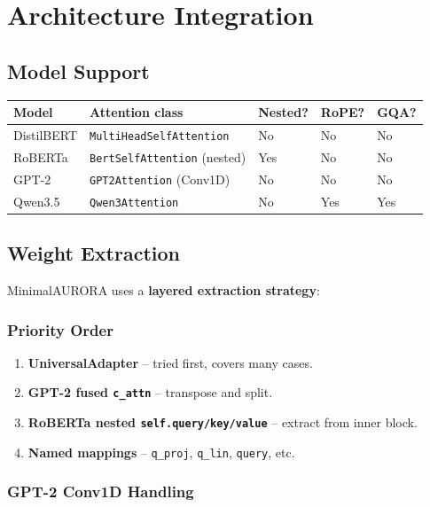 \section{Architecture Integration}

\subsection{Model Support}

\begin{table}[H]
\centering
\small
\begin{tabular}{lllll}
\toprule
\textbf{Model} & \textbf{Attention class} & \textbf{Nested?} & \textbf{RoPE?} & \textbf{GQA?} \\
\midrule
DistilBERT & \texttt{MultiHeadSelfAttention} & No & No & No \\
RoBERTa & \texttt{BertSelfAttention} (nested) & Yes & No & No \\
GPT-2 & \texttt{GPT2Attention} (Conv1D) & No & No & No \\
Qwen3.5 & \texttt{Qwen3Attention} & No & Yes & Yes \\
\bottomrule
\end{tabular}
\end{table}

\subsection{Weight Extraction}

MinimalAURORA uses a \textbf{layered extraction strategy}:

\subsubsection{Priority Order}

\begin{enumerate}
\item \textbf{UniversalAdapter} -- tried first, covers many cases.
\item \textbf{GPT-2 fused \texttt{c\_attn}} -- transpose and split.
\item \textbf{RoBERTa nested \texttt{self.query/key/value}} -- extract from inner block.
\item \textbf{Named mappings} -- \texttt{q\_proj}, \texttt{q\_lin}, \texttt{query}, etc.

\end{enumerate}
\subsubsection{GPT-2 Conv1D Handling}

